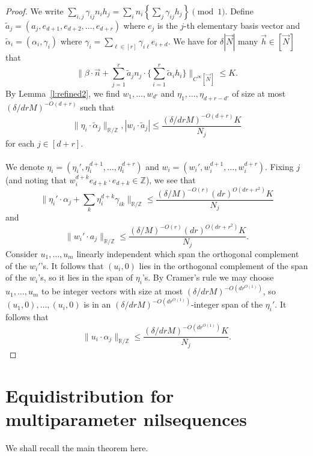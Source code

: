 \documentclass[11pt, a4paper]{amsart}
\theoremstyle{plain}
\theoremstyle{plain}
\theoremstyle{definition}
\theoremstyle{remark}
\numberwithin{equation}{section}
\numberwithin{lemma}{section}
\numberwithin{proposition}{section}
\numberwithin{corollary}{section}
\numberwithin{definition}{section}
\numberwithin{claim}{section}
\begin{document}
\begin{proof}
We write $\sum_{i, j} \gamma_{ij} n_ih_j = \sum_i n_i \left\{\sum_j \gamma_{ij} h_j \right\} \pmod{1}.$ Define $\tilde{a}_j = (a_j, e_{d+1}, e_{d+2}, \dots, e_{d+r})$ where $e_j$ is the $j$-th elementary basis vector and $\tilde{\alpha}_i = \left(\alpha_i, \gamma_{i}\right)$ where $\gamma_i = \sum_{\ell \in [r]}\gamma_{i\ell} e_{i+d}$. We have for $\delta|\vec{N}|$ many $\vec{h} \in [\vec{N}]$ that
$$\|\beta \cdot \vec{n} + \sum_{j = 1}^r \tilde{a}_j n_j \cdot \{\sum_{i = 1}^r \tilde{\alpha}_i h_i\} \|_{C^\infty[\vec{N}]} \le K.$$
By Lemma~\ref{l:refined2}, we find $w_1, \dots, w_{d'}$ and $\eta_1, \dots, \eta_{d + r - d'}$ of size at most $(\delta/drM)^{-O(d + r)}$ such that
$$\|\eta_i \cdot \tilde{\alpha}_j\|_{\mathbb{R}/\mathbb{Z}}, |w_i \cdot \tilde{a}_j| \le \frac{(\delta/drM)^{-O(d + r)}K}{N_j}$$
for each $j \in [d + r]$. \\\\
We denote $\eta_i = (\eta_i', \eta_i^{d+1}, \dots, \eta_i^{d + r})$ and $w_i = (w_i', w_i^{d+1}, \dots, w_i^{d + r})$. Fixing $j$ (and noting that $w_i^{d + k}e_{d+k} \cdot e_{d+k} \in \mathbb{Z}$), we see that
$$\|\eta_i' \cdot \alpha_j+\sum_k\eta_i^{d+k}\gamma_{ik}\|_{\mathbb{R}/\mathbb{Z}} \le \frac{(\delta/M)^{-O(r)}(dr)^{O(dr + r^2)}K}{N_j}$$
and
$$\|w_i' \cdot a_j\|_{\mathbb{R}/\mathbb{Z}} \le \frac{(\delta/M)^{-O(r)}(dr)^{O(dr + r^2)}K}{N_j}.$$
Consider $u_1, \dots, u_m$ linearly independent which span the orthogonal complement of the $w_i'$'s. It follows that $(u_i, 0)$ lies in the orthogonal complement of the span of the $w_i$'s, so it lies in the span of $\eta_i$'s. By Cramer's rule we may choose $u_1, \dots, u_m$ to be integer vectors with size at most $(\delta/drM)^{-O(dr^{O(1)})}$, so $(u_1, 0), \dots, (u_i, 0)$ is in an $(\delta/drM)^{-O(dr^{O(1)})}$-integer span of the $\eta_i'$. It follows that
$$\|u_i \cdot \alpha_j\|_{\mathbb{R}/\mathbb{Z}} \le \frac{(\delta/drM)^{-O(dr^{O(1)})}K}{N_j}.$$
\end{proof}

\section{Equidistribution for multiparameter nilsequences}\label{s:equidistribute}
We shall recall the main theorem here.

\mainresulta*
\end{document}
